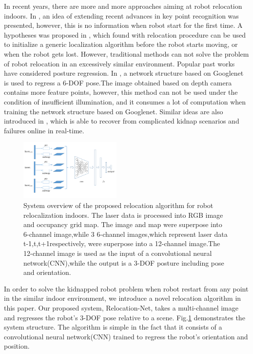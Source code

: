 \documentclass[journal]{IEEEtran}
\begin{document}
In recent years, there are more and more approaches aiming at robot relocation indoors. In \cite{williams2007real}, an idea of  extending recent advances in key point recognition was presented, however, this is no information when robot start for the first time. A hypotheses was proposed in \cite{williams2007real}, which found with relocation procedure can be used to initialize a generic localization algorithm before the robot starts moving, or when the robot gets lost. However, traditional methods can not solve the problem of robot relocation in an excessively similar environment. Popular past works have considered posture regression. In \cite{kendall2015posenet}, a network structure based on Googlenet \cite{szegedy2015going} is used to  regress a 6-DOF pose.The image obtained based on depth camera contains more feature points, however, this method can not be used under the condition of insufficient illumination, and it consumes a lot of computation when training the network structure based on Googlenet. Similar ideas are also introduced in \cite{kuse2019learning}, which is able to recover from complicated kidnap scenarios and failures online in real-time. 

\begin{figure}
	\centering
    \includegraphics[width=0.45\textwidth]{figure1.pdf}
    \caption{ System overview of the proposed relocation algorithm for robot relocalization indoors. The laser data is processed into RGB image and occupancy grid map. The image and map  were superpose into 6-channel image,while 3 6-channel images,which represent laser data t-1,t,t+1respectively, were superpose into a 12-channel image.The 12-channel image is used as the input of a  convolutional neural network(CNN),while the output is a 3-DOF  posture including pose and orientation.	}
    \label{fig:frame}
\end{figure}

In order to solve the kidnapped robot problem when robot restart from any point in the similar indoor environment, we  introduce a novel relocation  algorithm in this paper. Our proposed system, Relocation-Net, takes a multi-channel image and regresses the robot's 3-DOF pose relative to a scene. Fig.\ref{fig:frame} demonstrates the system structure. The algorithm is simple in the fact that it consists of a convolutional neural network(CNN) trained to regress the robot's orientation and position. 
\end{document}
